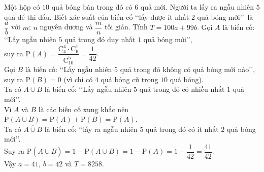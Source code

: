 \begin{bt}%
Một hộp có $10$ quả bóng bàn trong đó có $6$ quả mới. Người ta lấy ra ngẫu nhiên $5$ quả để thi đấu. Biết xác suất của biến cố \lq\lq lấy được ít nhất $2$ quả bóng mới\rq\rq\ là $\dfrac{a}{b}$ với $m$; $n$ nguyên dương và $\dfrac{m}{n}$ tối giản. Tính $T=100a+99b$.
\loigiai
{
Gọi $A$ là biến cố: \lq\lq Lấy ngẫu nhiên $5$ quả trong đó duy nhất $1$ quả bóng mới\rq\rq, \\
suy ra $\mathrm{P}(A)=\dfrac{\mathrm{C}_{4}^{4}\cdot\mathrm{C}_{6}^{1}}{\mathrm{C}_{10}^{5}}=\dfrac{1}{42}$.\\
Gọi $B$ là biến cố: \lq\lq Lấy ngẫu nhiên $5$ quả trong đó không có quả bóng mới nào\rq\rq, \\
suy ra $\mathrm{P}(B)=0$ (vì chỉ có $4$ quả bóng cũ trong $10$ quả bóng).\\
Ta có $A\cup B$ là biến cố: \lq\lq Lấy ngẫu nhiên $5$ quả trong đó có nhiều nhất $1$ quả mới\rq\rq. \\
Vì $A$ và $B$ là các biến cố xung khắc nên $\mathrm{P}(A\cup B)=\mathrm{P}(A)+\mathrm{P}(B)=\mathrm{P}(A)$.\\
Ta có $\overline{A\cup B}$ là biến cố: \lq\lq lấy ra ngẫu nhiên $5$ quả trong đó có ít nhất $2$ quả bóng mới\rq\rq.\\
Suy ra $\mathrm{P}\left(\overline{A\cup B}\right)=1-\mathrm{P}(A\cup B)=1-\mathrm{P}(A)=1-\dfrac{1}{42}=\dfrac{41}{42}$. \\
Vậy $a=41$, $b=42$ và $T=8258$.
}
\end{bt}

